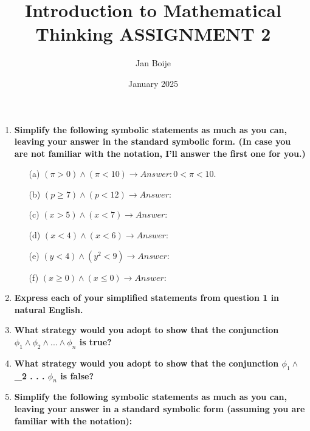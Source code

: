 \documentclass[12pt, letterpaper]{article}
\title{Introduction to Mathematical Thinking ASSIGNMENT 2}
\author{Jan Boije}
\date{January 2025}
\begin{document}
\maketitle

\begin{enumerate}
 
\item \textbf{Simplify the following symbolic statements as much as you can, leaving your answer in the standard
symbolic form. (In case you are not familiar with the notation, I’ll answer the first one for you.)}
\begin{enumerate}
 
\item[(a)] $(\pi > 0) \land (\pi < 10) \xrightarrow{}  Answer: 0 < \pi < 10.$
\item[(b)] $(p \ge  7) \land (p < 12) \xrightarrow{}  Answer:$
\item[(c)] $(x > 5) \land (x < 7) \xrightarrow{}  Answer:$
\item[(d)] $(x < 4) \land (x < 6) \xrightarrow{}  Answer:$
\item[(e)] $(y < 4) \land (y^2 < 9) \xrightarrow{}  Answer:$
\item[(f)] $(x \ge 0) \land (x \le 0) \xrightarrow{}  Answer:$
\end{enumerate}
\item \textbf{Express each of your simplified statements from question 1 in natural English.}
\item \textbf{What strategy would you adopt to show that the conjunction $\phi_1 \land \phi_2 \land . . . \land \phi_n $ is true?}
\item \textbf{What strategy would you adopt to show that the conjunction $\phi_1 \land $\phi_2 \land . . . \land $\phi_n $ is false?}
\item \textbf{Simplify the following symbolic statements as much as you can, leaving your answer in a standard
symbolic form (assuming you are familiar with the notation):}
\begin{enumerate}
 

\end{enumerate}
\end{enumerate}
\end{document}
